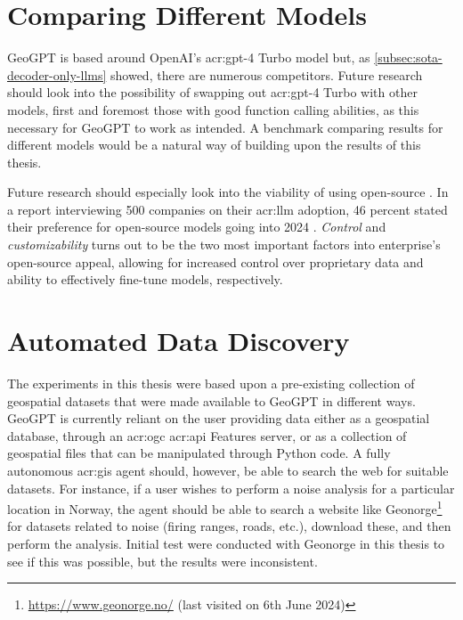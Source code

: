 \section{Comparing Different Models}
\label{sec:comparing-different-models}

GeoGPT is based around OpenAI's \acrshort{acr:gpt}-4 Turbo model but, as \autoref{subsec:sota-decoder-only-llms} showed, there are numerous competitors. Future research should look into the possibility of swapping out \acrshort{acr:gpt}-4 Turbo with other models, first and foremost those with good function calling abilities, as this necessary for GeoGPT to work as intended. A benchmark comparing results for different models would be a natural way of building upon the results of this thesis.

Future research should especially look into the viability of using open-source . In a report interviewing 500 companies on their \acrshort{acr:llm} adoption, 46 percent stated their preference for open-source models going into 2024 \citep{wangsarah16ChangesWay2024}. \textit{Control} and \textit{customizability} turns out to be the two most important factors into enterprise's open-source appeal, allowing for increased control over proprietary data and ability to effectively fine-tune models, respectively.

\section{Automated Data Discovery}
\label{sec:automated-data-discovery}

The experiments in this thesis were based upon a pre-existing collection of geospatial datasets that were made available to GeoGPT in different ways. GeoGPT is currently reliant on the user providing data either as a geospatial database, through an \acrshort{acr:ogc} \acrshort{acr:api} Features server, or as a collection of geospatial files that can be manipulated through Python code. A fully autonomous \acrshort{acr:gis} agent should, however, be able to search the web for suitable datasets. For instance, if a user wishes to perform a noise analysis for a particular location in Norway, the agent should be able to search a website like Geonorge\footnote{\url{https://www.geonorge.no/} (last visited on 6th June 2024)} for datasets related to noise (firing ranges, roads, etc.), download these, and then perform the analysis. Initial test were conducted with Geonorge in this thesis to see if this was possible, but the results were inconsistent.
